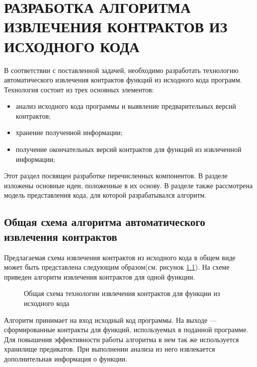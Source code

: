 \chapter{РАЗРАБОТКА АЛГОРИТМА ИЗВЛЕЧЕНИЯ КОНТРАКТОВ ИЗ ИСХОДНОГО КОДА}
\label{chapter:algoritm}
В соответствии с поставленной задачей, необходимо разработать технологию автоматического извлечения контрактов функций из исходного кода программ. Технология состоит из трех основных элементов:
\begin{itemize}
\item анализ исходного кода программы и выявление предварительных версий контрактов;
\item хранение полученной информации;
\item получение окончательных версий контрактов для функций из извлеченной информации;
\end{itemize}

Этот раздел посвящен разработке перечисленных компонентов. В разделе изложены основные идеи, положенные в их основу. В разделе также рассмотрена модель представления кода, для которой разрабатывался алгоритм.

\section{Общая схема алгоритма автоматического извлечения контрактов}
Предлагаемая схема извлечения контрактов из исходного кода в общем виде может быть представлена следующим образом(см. рисунок \ref{image:generalScheme}). На схеме приведен алгоритм извлечения контрактов для одной функции.
\begin{figure}[h!]
\caption{Общая схема технологии извлечения контрактов для функции из исходного кода}
\label{image:generalScheme}
\end{figure}

Алгоритм принимает на вход исходный код программы. На выходе --- сформированные контракты для функций, используемых в поданной программе. Для повышения эффективности работы алгоритма в нем так же используется хранилище предикатов. При выполнении анализа из него извлекается дополнительная информация о функции.


